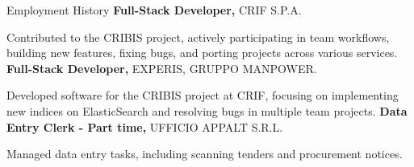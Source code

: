 \begin{rubric}{Employment History}
%
	\textbf{Full-Stack Developer,} CRIF S.P.A.
	\par Contributed to the CRIBIS project, actively participating in team workflows, building new features, fixing bugs, and porting projects across various services.
%
%
	\textbf{Full-Stack Developer,} EXPERIS, GRUPPO MANPOWER.
	\par Developed software for the CRIBIS project at CRIF, focusing on implementing new indices on ElasticSearch and resolving bugs in multiple team projects.
%
%
	\textbf{Data Entry Clerk - Part time,} UFFICIO APPALT S.R.L.
	\par Managed data entry tasks, including scanning tenders and procurement notices.
%
\end{rubric}